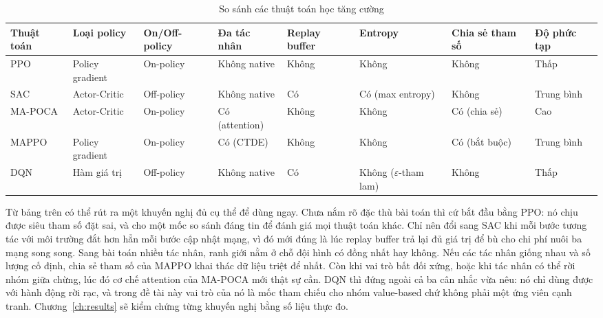 \begin{table}[H]
    \centering
    \caption{So sánh các thuật toán học tăng cường}
    \label{tab:algo_compare}
    \renewcommand{\arraystretch}{1.4}
    \tablefont
    \setlength{\tabcolsep}{3pt}
    \begin{tabular}{|>{\raggedright\arraybackslash}p{1.95cm}
                    |>{\raggedright\arraybackslash}p{1.6cm}
                    |>{\raggedright\arraybackslash}p{1.5cm}
                    |>{\raggedright\arraybackslash}p{1.8cm}
                    |>{\raggedright\arraybackslash}p{1.4cm}
                    |>{\raggedright\arraybackslash}p{1.7cm}
                    |>{\raggedright\arraybackslash}p{1.7cm}
                    |>{\raggedright\arraybackslash}p{1.5cm}|}
        \hline
        \textbf{Thuật toán} & \textbf{Loại policy} & \textbf{On/Off-policy} & \textbf{Đa tác nhân} & \textbf{Replay buffer} & \textbf{Entropy} & \textbf{Chia sẻ tham số} & \textbf{Độ phức tạp} \\
        \hline
        PPO & Policy gradient & On-policy & Không native & Không & Không & Không & Thấp \\
        \hline
        SAC & Actor-Critic & Off-policy & Không native & Có & Có (max entropy) & Không & Trung bình \\
        \hline
        MA-POCA & Actor-Critic & On-policy & Có (attention) & Không & Không & Có (chia sẻ) & Cao \\
        \hline
        MAPPO & Policy gradient & On-policy & Có (CTDE) & Không & Không & Có (bắt buộc) & Trung bình \\
        \hline
        DQN & Hàm giá trị & Off-policy & Không native & Có & Không ($\varepsilon$-tham lam) & Không & Thấp \\
        \hline
    \end{tabular}
\end{table}

\indent Từ bảng trên có thể rút ra một khuyến nghị đủ cụ thể để dùng ngay. Chưa nắm rõ đặc
thù bài toán thì cứ bắt đầu bằng PPO: nó chịu được siêu tham số đặt sai, và cho một mốc so
sánh đáng tin để đánh giá mọi thuật toán khác. Chỉ nên đổi sang SAC khi mỗi bước tương tác
với môi trường đắt hơn hẳn mỗi bước cập nhật mạng, vì đó mới đúng là lúc replay buffer trả
lại đủ giá trị để bù cho chi phí nuôi ba mạng song song. Sang bài toán nhiều tác nhân,
ranh giới nằm ở chỗ đội hình có đồng nhất hay không. Nếu các tác nhân giống nhau và số
lượng cố định, chia sẻ tham số của MAPPO khai thác dữ liệu triệt để nhất. Còn khi vai trò
bất đối xứng, hoặc khi tác nhân có thể rời nhóm giữa chừng, lúc đó cơ chế attention của
MA-POCA mới thật sự cần. DQN thì đứng ngoài cả ba cân nhắc vừa nêu: nó chỉ dùng được với
hành động rời rạc, và trong đề tài này vai trò của nó là mốc tham chiếu cho nhóm
value-based chứ không phải một ứng viên cạnh tranh. Chương~\ref{ch:results} sẽ kiểm chứng
từng khuyến nghị bằng số liệu thực đo.

